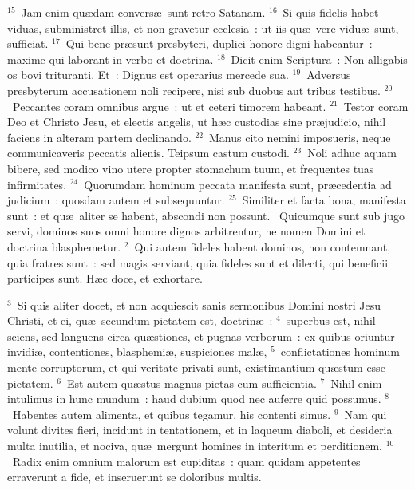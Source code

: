 ${}^{15}$~Jam enim qu\ae dam convers\ae\ sunt retro Satanam.
${}^{16}$~Si quis fidelis habet viduas, subministret illis, et non gravetur ecclesia~: ut iis qu\ae\ vere vidu\ae\ sunt, sufficiat.
${}^{17}$~Qui bene pr\ae sunt presbyteri, duplici honore digni habeantur~: maxime qui laborant in verbo et doctrina.
${}^{18}$~Dicit enim Scriptura~: Non alligabis os bovi trituranti. Et~: Dignus est operarius mercede sua.
${}^{19}$~Adversus presbyterum accusationem noli recipere, nisi sub duobus aut tribus testibus.
${}^{20}$~Peccantes coram omnibus argue~: ut et ceteri timorem habeant.
${}^{21}$~Testor coram Deo et Christo Jesu, et electis angelis, ut h\ae c custodias sine pr\ae judicio, nihil faciens in alteram partem declinando.
${}^{22}$~Manus cito nemini imposueris, neque communicaveris peccatis alienis. Teipsum castum custodi.
${}^{23}$~Noli adhuc aquam bibere, sed modico vino utere propter stomachum tuum, et frequentes tuas infirmitates.
${}^{24}$~Quorumdam hominum peccata manifesta sunt, pr\ae cedentia ad judicium~: quosdam autem et subsequuntur.
${}^{25}$~Similiter et facta bona, manifesta sunt~: et qu\ae\ aliter se habent, abscondi non possunt.
~\lettrine[lines=10,image=true,loversize=0.05,lraise=-0.03]{Q}{}uicumque sunt sub jugo servi, dominos suos omni honore dignos arbitrentur, ne nomen Domini et doctrina blasphemetur.
${}^{2}$~Qui autem fideles habent dominos, non contemnant, quia fratres sunt~: sed magis serviant, quia fideles sunt et dilecti, qui beneficii participes sunt. H\ae c doce, et exhortare.


${}^{3}$~Si quis aliter docet, et non acquiescit sanis sermonibus Domini nostri Jesu Christi, et ei, qu\ae\ secundum pietatem est, doctrin\ae~:
${}^{4}$~superbus est, nihil sciens, sed languens circa qu\ae stiones, et pugnas verborum~: ex quibus oriuntur invidi\ae , contentiones, blasphemi\ae , suspiciones mal\ae ,
${}^{5}$~conflictationes hominum mente corruptorum, et qui veritate privati sunt, existimantium qu\ae stum esse pietatem.
${}^{6}$~Est autem qu\ae stus magnus pietas cum sufficientia.
${}^{7}$~Nihil enim intulimus in hunc mundum~: haud dubium quod nec auferre quid possumus.
${}^{8}$~Habentes autem alimenta, et quibus tegamur, his contenti simus.
${}^{9}$~Nam qui volunt divites fieri, incidunt in tentationem, et in laqueum diaboli, et desideria multa inutilia, et nociva, qu\ae\ mergunt homines in interitum et perditionem.
${}^{10}$~Radix enim omnium malorum est cupiditas~: quam quidam appetentes erraverunt a fide, et inseruerunt se doloribus multis.


